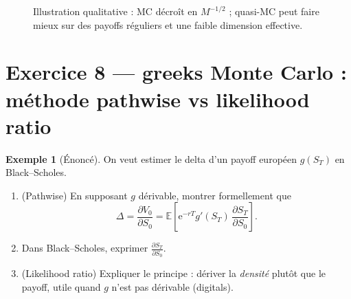 \documentclass[11pt,a4paper]{report}
\newcommand{\ee}{\mathrm{e}}
\newcommand{\E}{\mathbb{E}}
\newcommand{\1}{\mathbbm{1}}
\newcommand{\pd}[2]{\frac{\partial #1}{\partial #2}}
\theoremstyle{definition}
\newtheorem{example}{Exemple}[chapter]
\theoremstyle{plain}
\theoremstyle{remark}
\begin{document}
\begin{figure}[h!]
\centering
{}
\caption{Illustration qualitative : MC décroît en $M^{-1/2}$ ; quasi-MC peut faire mieux sur des payoffs réguliers et une faible dimension effective.}
\end{figure}

\section{Exercice 8 --- greeks Monte Carlo : méthode pathwise vs likelihood ratio}
\begin{example}[Énoncé]
On veut estimer le delta d'un payoff européen $g(S_T)$ en Black--Scholes.
\begin{enumerate}[label=\alph*)]
  \item (Pathwise) En supposant $g$ dérivable, montrer formellement que
  \[\Delta = \pd{V_0}{S_0}=\E\left[\ee^{-rT} g'(S_T)\,\pd{S_T}{S_0}\right].\]
  \item Dans Black--Scholes, exprimer $\pd{S_T}{S_0}$.
  \item (Likelihood ratio) Expliquer le principe : dériver la \emph{densité} plutôt que le payoff, utile quand $g$ n'est pas dérivable (digitals).
\end{enumerate}
\end{example}
\end{document}
